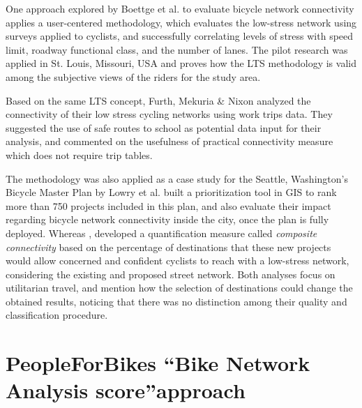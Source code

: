 \documentclass[information,article,submit,moreauthors,pdftex,10pt,a4paper]{mdpi}
\theoremstyle{mdpi}
\newcounter{ex}
\newcounter{re}
\theoremstyle{mdpidefinition}
\begin{document}
\begin{mycolorbox}[colback=yellow]
One approach explored by Boettge et al. \cite{Boettge2017} to evaluate bicycle network connectivity applies a user-centered methodology, which evaluates the low-stress network using surveys applied to cyclists, and successfully correlating levels of stress with speed limit, roadway functional class, and the number of lanes. The pilot research was applied in St. Louis, Missouri, USA and proves how the LTS methodology is valid among the subjective views of the riders for the study area.

Based on the same LTS concept, Furth, Mekuria \& Nixon \cite{Furth2016} analyzed the connectivity of their low stress cycling networks using work trips data. They suggested the use of safe routes to school as potential  data input for their analysis, and commented on the usefulness of practical connectivity measure which does not require trip tables. 

The methodology was also applied as a case study for the Seattle, Washington’s Bicycle Master Plan by Lowry et al. \cite{Lowry2016} built a prioritization tool in GIS to rank more than 750 projects included in this plan, and also evaluate their impact regarding bicycle network connectivity inside the city, once the plan is fully deployed. Whereas \cite{Lowry2017}, developed a quantification measure called \textit{composite connectivity} based on the percentage of destinations that these new projects would allow concerned and confident cyclists to reach with a low-stress network, considering the existing and proposed street network. Both analyses focus on utilitarian travel, and mention how the selection of destinations could change the obtained results, noticing that there was no distinction among their quality and classification procedure. 
\end{mycolorbox}

\section{PeopleForBikes \textquotedblleft Bike Network Analysis score\textquotedblright approach} \label{pfb}
\end{document}
